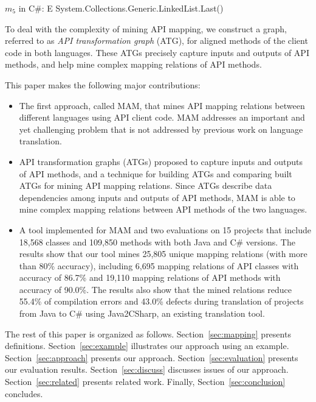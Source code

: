 \begin{CodeOut}
$m_5$ in C\#: E System.Collections.Generic.LinkedList.Last()
\end{CodeOut}

To deal with the complexity of mining API mapping, we construct a
graph, referred to as \emph{API transformation graph} (ATG), for
aligned methods of the client code in both languages. These ATGs
precisely capture inputs and outputs of API methods, and help mine
complex mapping relations of API methods.

This paper makes the following major contributions:

\begin{itemize}\vspace*{-1.5ex}
\item The first approach, called MAM, that mines API mapping relations between
different languages using API client code. MAM
addresses an important and yet challenging problem that is not
addressed by previous work on language translation.\vspace*{-1.5ex}
\item API transformation graphs (ATGs) proposed to capture inputs
and outputs of API methods, and a technique for building ATGs and
comparing built ATGs for mining API mapping relations. Since ATGs describe data
dependencies among inputs and outputs of API methods, MAM is able to
mine complex mapping relations between API methods of the two
languages.\vspace*{-1.5ex}
\item A tool implemented for MAM and two
evaluations on 15 projects that include 18,568 classes and 109,850
methods with both Java and C\# versions. The results show that our
tool mines 25,805 unique mapping relations (with more than 80\% accuracy), 
including 6,695 mapping relations of API classes with accuracy of
86.7\% and 19,110 mapping relations of API methods with accuracy of
90.0\%. The results also show that the mined relations
reduce 55.4\% of compilation errors and 43.0\% defects during
translation of projects from Java to C\# using Java2CSharp, an existing translation tool.
\end{itemize}\vspace*{-1.5ex}

The rest of this paper is organized as follows.
Section~\ref{sec:mapping} presents definitions.
Section~\ref{sec:example} illustrates our approach using an example.
Section~\ref{sec:approach} presents our approach.
Section~\ref{sec:evaluation} presents our evaluation results.
Section~\ref{sec:discuss} discusses issues of our approach.
Section~\ref{sec:related} presents related work.
Finally, Section~\ref{sec:conclusion} concludes.
